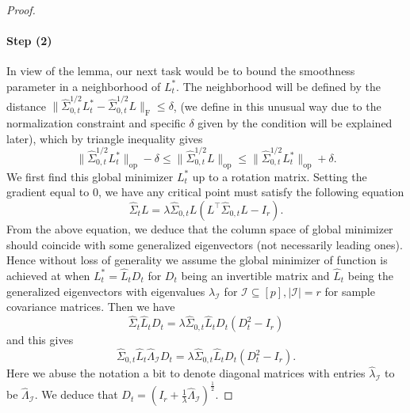 \documentclass[11pt]{article}
\newcommand{\nb}[1]{\textcolor{orange}{\texttt{[#1]}}}
\newcommand{\gsc}[1]{\textcolor{blue}{\texttt{[#1]}}}
\newcommand{\sot}{\widehat{\Sigma}_{0,t}}
\newcommand{\cI}{{\mathcal{I}}}
\newcommand{\0}{{\mathbf{0}}}
\newcommand{\op}{{\mathrm{op}}}
\begin{document}
\begin{proof}
\paragraph{Step (2)} 
In view of the lemma, our next task would be to bound the smoothness parameter in a neighborhood of $L_t^*$.  The neighborhood will be defined by the distance $\|\sot^{1/2}L_t^*-\sot^{1/2} L\|_\mathrm{F}\leq \delta$, (we define in this unusual way due to the normalization constraint and specific $\delta$ given by the condition will be explained later), which by triangle inequality gives\begin{equation*}
\|\sot^{1/2}L^*_t\|_\op-\delta\leq  \|\sot^{1/2}L\|_{\op}\leq \|\sot^{1/2}L^*_t\|_\op+\delta.
\end{equation*}
We first find this global minimizer $L_t^*$ up to a rotation matrix. Setting the gradient equal to 0, we have any critical point must satisfy the following equation\begin{equation*}
    \widehat{\Sigma}_tL=\lambda\sot L(L^\top \sot L-I_r).
\end{equation*}
From the above equation, we deduce that the column space of global minimizer should coincide with some generalized eigenvectors (not necessarily leading ones). Hence without loss of generality we assume the global minimizer of function is achieved at when $L^*_t=\widehat{L}_tD_t$ for $D_t$ being an invertible matrix and $\widehat{L}_t$ being the generalized eigenvectors with eigenvalues $\widehat{\lambda}_\cI$ for $\cI\subseteq[p], |\cI|=r$ for sample covariance matrices. Then we have \begin{equation*}
    \widehat{\Sigma}_t\widehat{L}_tD_t=\lambda\sot \widehat{L}_tD_t(D_t^2-I_r)
\end{equation*}
and this gives\begin{equation*}
    \sot \widehat{L}_t\widehat{\Lambda}_\cI D_t=\lambda\sot \widehat{L}_tD_t(D_t^2-I_r).
\end{equation*}
Here we abuse the notation a bit to denote diagonal matrices with entries $\widehat{\lambda}_\cI$ to be $\widehat{\Lambda}_\cI$. 
We deduce that $D_t=(I_r+\frac{1}{\lambda}\widehat{\Lambda}_\cI)^{\frac{1}{2}}$. 

\end{proof}
\end{document}
